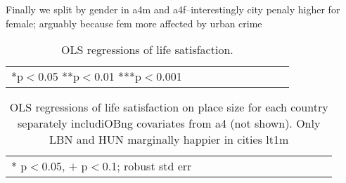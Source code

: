 \documentclass[10pt, letterpaper]{article}
\begin{document}
\begin{spacing}{1.4}
Finally we split by gender in a4m and a4f--interestingly city penaly higher for female; arguably because fem more affected by urban crime 

\begin{table}[H]\centering\caption{OLS regressions of life satisfaction.} \label{regA} \begin{scriptsize} \begin{tabular}{p{2.2in}p{.6in}p{.6in}p{.6in}p{.6in}|p{.6in}p{.6in}p{.6in}p{.6in}p{.6in}p{.6 in}p{.6in}p{.6 in}}\hline  \hline\multicolumn{4}{l}{*p$<$0.05 **p$<$0.01 ***p$<$0.001} \end{tabular}\end{scriptsize}\end{table}




\begin{spacing}{.9} \begin{table}[H]\centering   \begin{scriptsize} \begin{tabular}{p{.5in}p{.5in}p{.5in}p{.5in}p{.5in}p{.5in}p{.5in}p{.5in}p{.5in}p{.5in}p{.5
                                                                      in}p{.5in}p{.5
                                                                      in}}\hline
                                                                      
                                                                      \hline *
                                                                      p$<$0.05,
                                                                      $+$
                                                                      p$<$0.1;
                                                                      robust std
                                                                      err \end{tabular}\end{scriptsize}\caption{\label{a4cou}OLS
                                                                    regressions
                                                                    of life satisfaction on
                                                                    place size
                                                                    for each
                                                                    country
                                                                    separately
                                                                    includiOBng
                                                                    covariates
                                                                    from a4 (not
                                                                    shown). Only
                                                                  LBN and HUN
                                                                  marginally
                                                                  happier in
                                                                  cities lt1m
                                                           }\end{table} \end{spacing}



\end{spacing}
\end{document}
